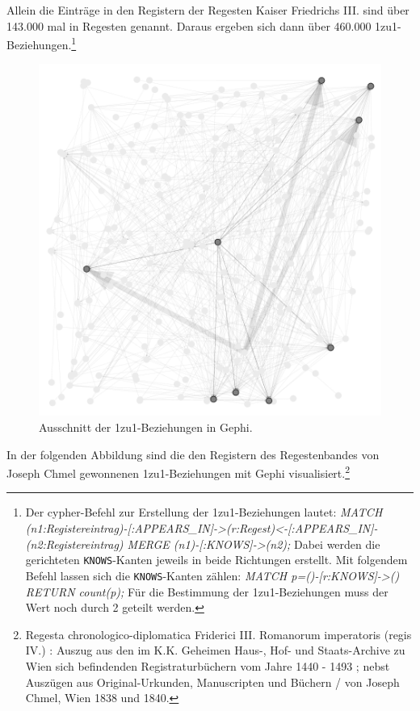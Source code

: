 \documentclass[ngerman,]{scrreprt}
\begin{document}
Allein die Einträge in den Registern der Regesten Kaiser Friedrichs III. sind über 143.000 mal in Regesten genannt. Daraus ergeben sich dann über 460.000 1zu1-Beziehungen.\footnote{Der cypher-Befehl zur Erstellung der 1zu1-Beziehungen lautet: \emph{MATCH (n1:Registereintrag)-{[}:APPEARS\_IN{]}-\textgreater{}(r:Regest)\textless{}-{[}:APPEARS\_IN{]}-(n2:Registereintrag) MERGE (n1)-{[}:KNOWS{]}-\textgreater{}(n2);} Dabei werden die gerichteten \texttt{KNOWS}-Kanten jeweils in beide Richtungen erstellt. Mit folgendem Befehl lassen sich die \texttt{KNOWS}-Kanten zählen: \emph{MATCH p=()-{[}r:KNOWS{]}-\textgreater{}() RETURN count(p);} Für die Bestimmung der 1zu1-Beziehungen muss der Wert noch durch 2 geteilt werden.}

\begin{figure}
\centering
\includegraphics{Bilder/Gephi-Register.png}
\caption{Ausschnitt der 1zu1-Beziehungen in Gephi.}
\end{figure}

In der folgenden Abbildung sind die den Registern des Regestenbandes von Joseph Chmel gewonnenen 1zu1-Beziehungen mit Gephi visualisiert.\footnote{Regesta chronologico-diplomatica Friderici III. Romanorum imperatoris (regis IV.) : Auszug aus den im K.K. Geheimen Haus-, Hof- und Staats-Archive zu Wien sich befindenden Registraturbüchern vom Jahre 1440 - 1493 ; nebst Auszügen aus Original-Urkunden, Manuscripten und Büchern / von Joseph Chmel, Wien 1838 und 1840.}
\end{document}
